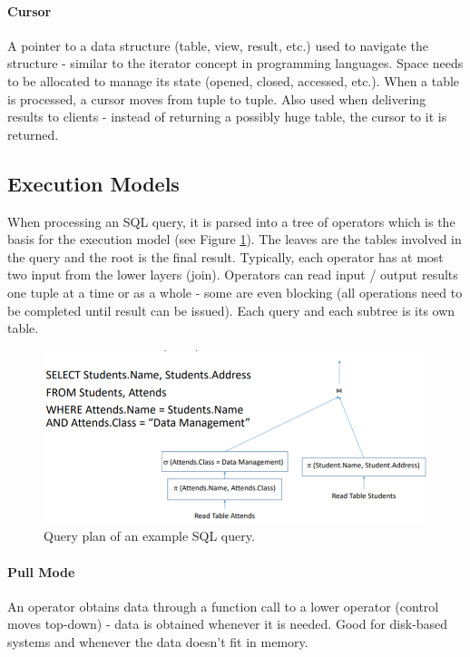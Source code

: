 
\paragraph{Cursor}
A pointer to a data structure (table, view, result, etc.) used to navigate the structure - similar to the iterator concept in programming languages. Space needs to be allocated to manage its state (opened, closed, accessed, etc.). When a table is processed, a cursor moves from tuple to tuple. Also used when delivering results to clients - instead of returning a possibly huge table, the cursor to it is returned. %


\subsection{Execution Models}

When processing an SQL query, it is parsed into a tree of operators which is the basis for the execution model (see Figure \ref{fig:tree}). The leaves are the tables involved in the query and the root is the final result. Typically, each operator has at most two input from the lower layers (join). Operators can read input / output results one tuple at a time or as a whole - some are even blocking (all operations need to be completed until result can be issued). Each query and each subtree is its own table.

\begin{figure}[h]
	\centering
	\includegraphics[scale=0.6]{images/3-tree.PNG}
	\caption{Query plan of an example SQL query.}
	\label{fig:tree}
\end{figure}

\paragraph{Pull Mode}
An operator obtains data through a function call to a lower operator (control moves top-down) - data is obtained whenever it is needed. Good for disk-based systems and whenever the data doesn't fit in memory.

